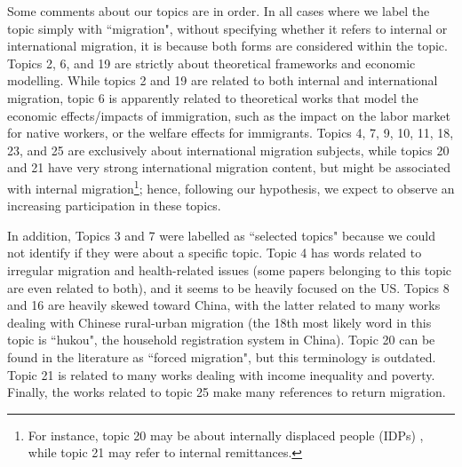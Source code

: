 \begin{landscape}

\end{landscape}

\begin{landscape}

\end{landscape}

Some comments about our topics are in order. In all cases where we label the topic simply with ``migration", without specifying whether it refers to internal or international migration, it is because both forms are considered within the topic. Topics 2, 6, and 19 are strictly about theoretical frameworks and economic modelling. While topics 2 and 19 are related to both internal and international migration, topic 6 is apparently related to theoretical works that model the economic effects/impacts of immigration, such as the impact on the labor market for native workers, or the welfare effects for immigrants. Topics 4, 7, 9, 10, 11, 18, 23, and 25 are exclusively about international migration subjects, while topics 20 and 21 have very strong international migration content, but might be associated with internal migration\footnote{For instance, topic 20 may be about internally displaced people (IDPs) \citep{talleraas_humanitarian_2022}, while topic 21 may refer to internal remittances.}; hence, following our hypothesis, we expect to observe an increasing participation in these topics. 

In addition, Topics 3 and 7 were labelled as ``selected topics" because we could not identify if they were about a specific topic. Topic 4 has words related to irregular migration and health-related issues (some papers belonging to this topic are even related to both), and it seems to be heavily focused on the US. Topics 8 and 16 are heavily skewed toward China, with the latter related to many works dealing with Chinese rural-urban migration (the 18th most likely word in this topic is ``hukou", the household registration system in China). Topic 20 can be found in the literature as ``forced migration", but this terminology is outdated. Topic 21 is related to many works dealing with income inequality and poverty. Finally, the works related to topic 25 make many references to return migration.

